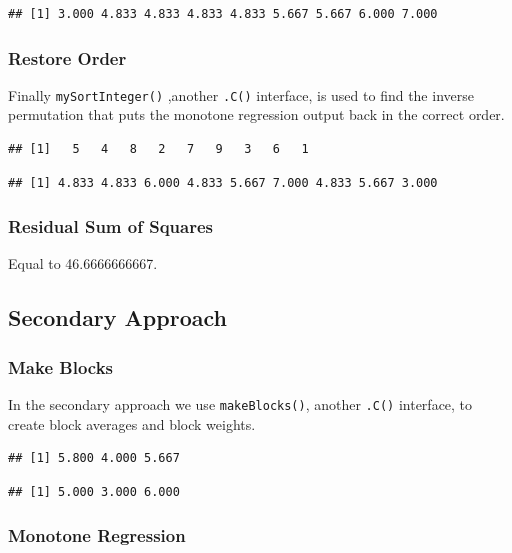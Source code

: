 \documentclass[12pt,]{article}
\begin{document}
\begin{verbatim}
## [1] 3.000 4.833 4.833 4.833 4.833 5.667 5.667 6.000 7.000
\end{verbatim}

\subsubsection{Restore Order}\label{restore-order}

Finally \texttt{mySortInteger()} ,another \texttt{.C()} interface, is
used to find the inverse permutation that puts the monotone regression
output back in the correct order.

\begin{verbatim}
## [1]   5   4   8   2   7   9   3   6   1
\end{verbatim}

\begin{verbatim}
## [1] 4.833 4.833 6.000 4.833 5.667 7.000 4.833 5.667 3.000
\end{verbatim}

\subsubsection{Residual Sum of Squares}\label{residual-sum-of-squares}

Equal to 46.6666666667.

\subsection{Secondary Approach}\label{secondary-approach}

\subsubsection{Make Blocks}\label{make-blocks}

In the secondary approach we use \texttt{makeBlocks()}, another
\texttt{.C()} interface, to create block averages and block weights.

\begin{verbatim}
## [1] 5.800 4.000 5.667
\end{verbatim}

\begin{verbatim}
## [1] 5.000 3.000 6.000
\end{verbatim}

\subsubsection{Monotone Regression}\label{monotone-regression-1}
\end{document}
